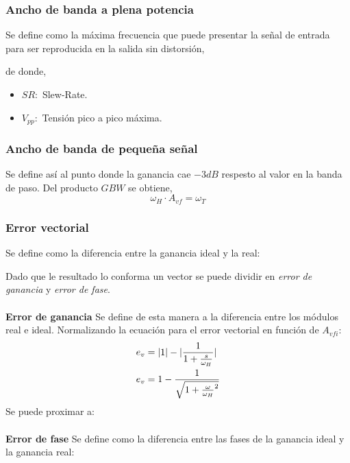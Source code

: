 \subsubsection{Ancho de banda a plena potencia}
\onehalfspacing
Se define como la máxima frecuencia que puede presentar la señal de entrada para ser reproducida en la salida sin distorsión,
\begin{center}
\end{center}
de donde,
\begin{itemize}
    \item $SR:$ Slew-Rate.
    \item $V_{pp}:$ Tensión pico a pico máxima.
\end{itemize}

\subsubsection{Ancho de banda de pequeña señal}
\onehalfspacing
Se define así al punto donde la ganancia cae $-3dB$ respesto al valor en la banda de paso. Del producto $GBW$ se obtiene,
\begin{equation}
   \nonumber
   \omega_H \cdot A_{vf} = \omega_T 
\end{equation}
\begin{center}
\end{center}

\subsubsection{Error vectorial}
\onehalfspacing
Se define como la diferencia entre la ganancia ideal y la real:
\begin{center}
\end{center}
Dado que le resultado lo conforma un vector se puede dividir en \textit{error de ganancia} y \textit{error de fase}.
\paragraph{}
\textbf{Error de ganancia}
\onehalfspacing
Se define de esta manera a la diferencia entre los módulos real e ideal. Normalizando la ecuación para el error vectorial en función de $A_{vfi}$:
\begin{align}
    \nonumber
    e_v&=|1| - \lvert\frac{1}{1+\frac{s}{\omega_H}}\rvert \\
    \nonumber
    e_v &= 1 - \frac{1}{\sqrt{1+\frac{\omega}{\omega_H}^2}}
\end{align}
Se puede proximar a:
\begin{center}
\end{center}

\paragraph{}
\textbf{Error de fase}
\onehalfspacing
Se define como la diferencia entre las fases de la ganancia ideal y la ganancia real:
\begin{center}
\end{center}

